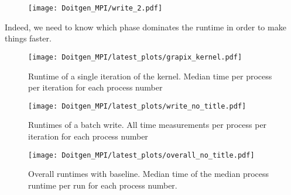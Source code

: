 \begin{figure}
  \texttt{[image: Doitgen\_MPI/write\_2.pdf]}\hfill
  \caption{}
  \label{fig:doitgen_mpi_write_strategy}
\end{figure}


Indeed, we need to know which phase dominates the runtime in order to make things faster.
\begin{figure}
  \texttt{[image: Doitgen\_MPI/latest\_plots/grapix\_kernel.pdf]}\hfill
  \caption{Runtime of a single iteration of the kernel. Median time per process per iteration for each process number}
  \label{fig:doitgen_mpi_kernel_basic}
\end{figure}

\begin{figure}
  \texttt{[image: Doitgen\_MPI/latest\_plots/write\_no\_title.pdf]}\hfill
  \caption{Runtimes of a batch write. All time measurements per process per iteration for each process number}
  \label{fig:doitgen_mpi_write_basic}
\end{figure}

\begin{figure}
  \texttt{[image: Doitgen\_MPI/latest\_plots/overall\_no\_title.pdf]}\hfill
  \caption{Overall runtimes with baseline. Median time of the median process runtime per run for each process number.}
  \label{fig:doitgen_mpi_overall_basic}
\end{figure}

